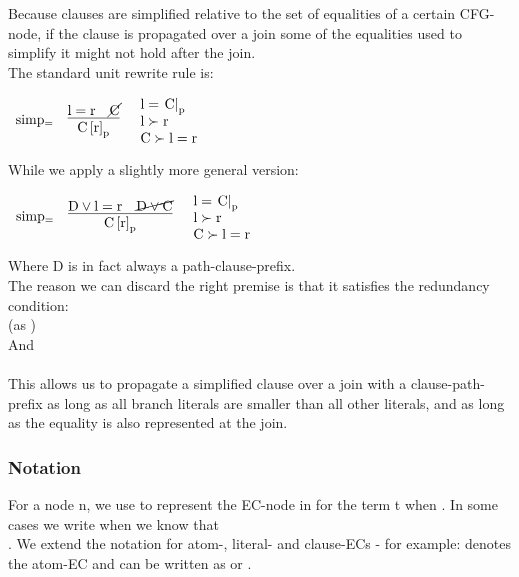 Because clauses are simplified relative to the set of equalities of a certain CFG-node, if the clause is propagated over a join some of the equalities used to simplify it might not hold after the join.\\
The standard unit rewrite rule is:

\bigskip

$
\begin{array}[c]{llll}
\m{simp_{=}} & \vcenter{\infer[]{\m{\termRepAt{C}{r}{p}}}{\m{l=r} & \cancel{\m{C}}}}   &
\parbox[c][1.2cm]{3cm}{\m{l=\termAt{C}{p}}\\\m{l \succ r}\\\m{C \succ l=r}}\\
\end{array}
$

\bigskip

\noindent
While we apply a slightly more general version:

\bigskip

$
\begin{array}[c]{llll}
\m{simp_{=}} & \vcenter{\infer[]{\m{\termRepAt{C}{r}{p}}}{\m{D \lor l=r} & \cancel{\m{D \lor C}}}}   &
\parbox[c][1.2cm]{3cm}{\m{l=\termAt{C}{p}}\\\m{l \succ r}\\\m{C \succ l=r}}\\
\end{array}
$

\bigskip

\noindent
Where D is in fact always a path-clause-prefix.\\
The reason we can discard the right premise is that it satisfies the redundancy condition:\\
 (as )\\
And\\
\\
This allows us to propagate a simplified clause over a join with a clause-path-prefix as long as all branch literals are smaller than all other literals, and as long as the equality is also represented at the join.


\subsubsection*{Notation}
For a node n, we use  to represent the EC-node in  for the term t when .
In some cases we write  when we know that \\
.
We extend the notation for atom-, literal- and clause-ECs - for example:
 denotes the atom-EC  and 
 can be written as  or .


